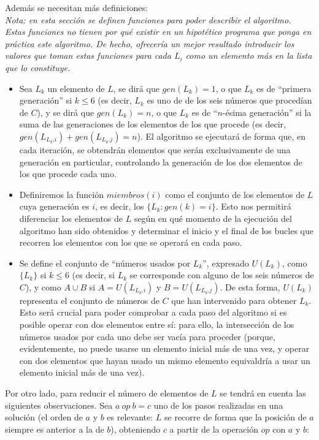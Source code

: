 \documentclass{article}
\begin{document}
Además se necesitan más definiciones:\\
\emph{Nota: en esta sección se definen funciones para poder describir el algoritmo. Estas funciones no tienen por qué existir en un hipotético programa que ponga en práctica este algoritmo. De hecho, ofrecería un mejor resultado introducir los valores que toman estas funciones para cada $L_i$ como un elemento más en la lista que lo constituye.}
\begin{itemize}
	\item Sea $L_k$ un elemento de $L$, se dirá que $gen(L_k) = 1$, o que $L_k$ es de ``primera generación'' si $k \le 6$ (es decir, $L_k$ es uno de de los seis números que procedían de $C$), y se dirá que $gen(L_k) = n$, o que $L_k$ es de ``$n$-ésima generación'' si la suma de las generaciones de los elementos de los que procede (es decir, $gen(L_{L_k.i}) + gen(L_{L_k.j}) = n$). El algoritmo se ejecutará de forma que, en cada iteración, se obtendrán elementos que serán exclusivamente de una generación en particular, controlando la generación de los dos elementos de los que procede cada uno.
	
	\item Definiremos la función $miembros(i)$ como el conjunto de los elementos de $L$ cuya generación es $i$, es decir, los $\{L_k : gen(k) = i\}$. Esto nos permitirá diferenciar los elementos de $L$ según en qué momento de la ejecución del algoritmo han sido obtenidos y determinar el inicio y el final de los bucles que recorren los elementos con los que se operará en cada paso.

	\item Se define el conjunto de ``números usados por $L_k$'', expresado $U(L_k)$, como $\{L_k\}$ si $k \le 6$ (es decir, si $L_k$ se corresponde con alguno de los seis números de $C$), y como $A \cup B$ si $A =U(L_{L_k.i})$ y $B = U(L_{L_k.j})$. De esta forma, $U(L_k)$ representa el conjunto de números de $C$ que han intervenido para obtener $L_k$. Esto será crucial para poder comprobar a cada paso del algoritmo si es posible operar con dos elementos entre sí: para ello, la intersección de los números usados por cada uno debe ser vacía para proceder (porque, evidentemente, no puede usarse un elemento inicial más de una vez, y operar con dos elementos que hayan usado un mismo elemento equivaldría a usar un elemento inicial más de una vez).
	
\end{itemize}

Por otro lado, para reducir el número de elementos de $L$ se tendrá en cuenta las siguientes observaciones. Sea $a\ op\ b = c$ uno de los pasos realizadas en una solución (el orden de $a$ y $b$ es relevante: $L$ se recorre de forma que la posición de $a$ siempre es anterior a la de $b$), obteniendo $c$ a partir de la operación $op$ con $a$ y $b$:
\end{document}
